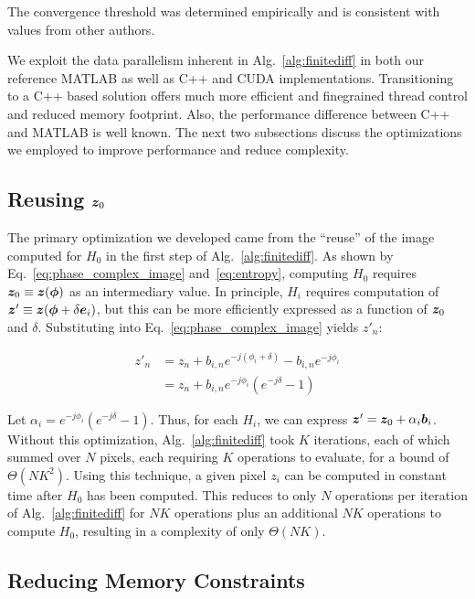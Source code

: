The convergence threshold was determined empirically and is consistent with
values from other authors.

We exploit the data parallelism inherent in Alg.~\ref{alg:finitediff} in both
our reference MATLAB as well as C++ and CUDA implementations. Transitioning to a
C++ based solution offers much more efficient and finegrained thread control and
reduced memory footprint. Also, the performance difference between C++ and
MATLAB is well known. The next two subsections discuss the optimizations we
employed to improve performance and reduce complexity. 
 
\subsection{Reusing $\bm{z}_{0}$}

The primary optimization we developed came from the ``reuse'' of the image
computed for $H_0$ in the first step of Alg.~\ref{alg:finitediff}. As shown by
Eq.~\ref{eq:phase_complex_image} and~\ref{eq:entropy}, computing $H_0$ requires
$\bm{z}_{0} \equiv \bm{z}(\bm{\phi})$ as an intermediary value. In principle, $H_i$
requires computation of $\bm{z}' \equiv \bm{z}(\bm{\phi} + \delta \bm{e}_{i})$, but this can
be more efficiently expressed as a function of $\bm{z}_{0}$ and $\delta$.
Substituting into Eq.~\ref{eq:phase_complex_image} yields $z'_n$:

\begin{equation}\label{eq:z_prime}
  \begin{split}
    z'_n &= z_n + b_{i,n}e^{-j(\phi_{i} + \delta)} - b_{i,n}e^{-j\phi_{i}} \\
    &= z_n + b_{i,n}e^{-j\phi_{i}}(e^{-j\delta} - 1)
  \end{split}
\end{equation}

Let $\alpha_{i} = e^{-j\phi_{i}}(e^{-j\delta} - 1)$. Thus, for each $H_i$, we
can express $\bm{z}' = \bm{z}_{0} + \alpha_{i} \bm{b}_i$. Without this
optimization, Alg.~\ref{alg:finitediff} took $K$ iterations, each of which
summed over $N$ pixels, each requiring $K$ operations to evaluate, for a bound
of $\Theta(NK^2)$. Using this technique, a given pixel $z_i$ can be computed in
constant time after $H_0$ has been computed. This reduces to only $N$ operations
per iteration of Alg.~\ref{alg:finitediff} for $NK$ operations plus an
additional $NK$ operations to compute $H_0$, resulting in a complexity of only
$\Theta(NK)$.

\subsection{Reducing Memory Constraints}

